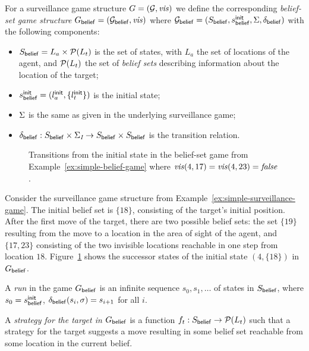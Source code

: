 For a surveillance game structure $G = (\mathcal{G},\mathit{vis})$ we define the corresponding \emph{belief-set game structure} $G_{\mathsf{belief}}  = (\mathcal{G}_{\mathsf{belief}},\mathit{vis})$ where $\mathcal{G}_{\mathsf{belief}} = (S_{\mathsf{belief}},s^{\mathsf{init}}_{\mathsf{belief}},\Sigma,\delta_{\mathsf{belief}})$ with the following components:
\begin{itemize}
\item $S_{\mathsf{belief}} = L_a \times \mathcal{P}(L_t)$ is the set of states, with $L_a$ the set of locations of the agent, and $\mathcal{P}(L_t)$ the set of \emph{belief sets} describing information about the location of the target;
\item $s^{\mathsf{init}}_{\mathsf{belief}} = (l_a^{\mathsf{init}},\{l_t^{\mathsf{init}}\})$ is the initial state;
\item $\Sigma$ is the same as given in the underlying surveillance game;
\item $\delta_{\mathsf{belief}}: S_{\mathsf{belief}} \times \Sigma_{\textit{I}} \rightarrow S_{\mathsf{belief}} \times S_{\mathsf{belief}}$ is the transition relation.
\end{itemize}
\begin{figure}



\caption{Transitions from the initial state in the belief-set game from Example~\ref{ex:simple-belief-game} where $\mathit{vis}(4,17) = \mathit{vis}(4,23) = \mathit{false}$.}
\label{fig:simple-belief-game}

\end{figure}

\begin{example}\label{ex:simple-belief-game}
Consider the surveillance game structure from Example~\ref{ex:simple-surveillance-game}. The initial belief set is $\{18\}$, consisting of the target's initial position. After the first move of the target, there are two possible belief sets: the set $\{19\}$ resulting from the move to a location in the area of sight of the agent, and $\{17,23\}$ consisting of the two invisible locations reachable in one step from location $18$.
Figure~\ref{fig:simple-belief-game} shows the successor states of the initial state $(4,\{18\})$ in $G_{\mathsf{belief}}$. 
\end{example}

A \emph{run} in the game $G_{\mathsf{belief}}$ is an infinite sequence $s_0,s_1,\ldots$ of states in $S_{\mathsf{belief}}$, where $s_0 = s_{\mathsf{belief}}^{\mathsf{init}}$,  $\delta_{\mathsf{belief}}(s_i,\sigma) = s_{i+1}$ for all $i$. 

A \emph{strategy for the target in $G_{\mathsf{belief}}$} is a function $f_t: S_{\mathsf{belief}} \to \mathcal{P}(L_t)$ such that a strategy for the target suggests a move resulting in some belief set reachable from some location in the current belief.

